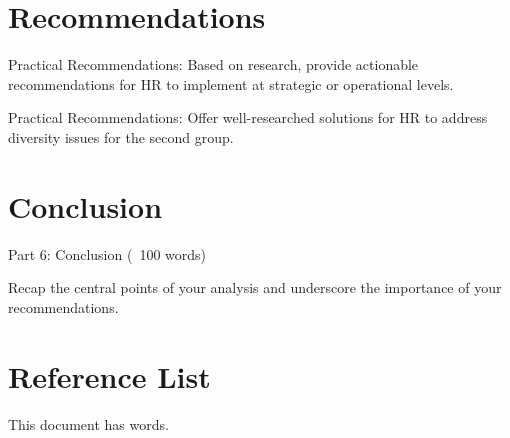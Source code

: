 \documentclass{article}
\begin{document}
\section{Recommendations}
Practical Recommendations: Based on research, provide actionable recommendations for HR to implement at strategic or operational levels.

Practical Recommendations: Offer well-researched solutions for HR to address diversity issues for the second group.

\section{Conclusion}
Part 6: Conclusion (~100 words)

Recap the central points of your analysis and underscore the importance of your recommendations.
\section{Reference List}
\printbibliography
This document has \emph{\bashStdout} words.
\end{document}
